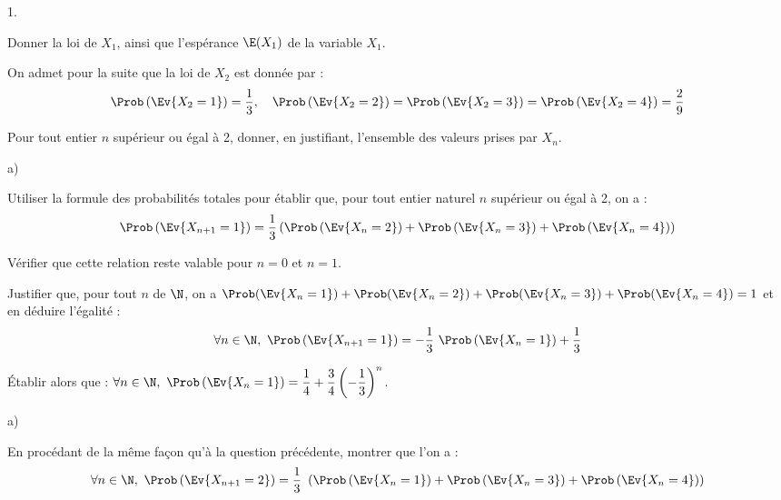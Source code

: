 \begin{noliste}{1.}
  \setlength{\itemsep}{4mm}
\item Donner la loi de $X_{1}$, ainsi que l'espérance $\E(X_{1})$ de
  la variable $X_{1}$.

  
  On admet pour la suite que la loi de $X_{2}$ est donnée par :
  \[
  \Prob\left(\Ev{X_{2} = 1}\right) = \dfrac{1}{3}, \quad
  \Prob\left(\Ev{X_{2} = 2}\right) = \Prob\left(\Ev{X_{2} = 3}\right)
  = \Prob\left(\Ev{X_{2} = 4}\right) = \dfrac{2}{9}
  \]




\item Pour tout entier $n$ supérieur ou égal à 2, donner, en
  justifiant, l'ensemble des valeurs prises par $X_{n}$.

  

\item
  \begin{noliste}{a)}
    \setlength{\itemsep}{2mm}
  \item Utiliser la formule des probabilités totales pour établir que,
    pour tout entier naturel $n$ supérieur ou égal à 2, on a :
    \[
    \Prob\left(\Ev{X_{n + 1} = 1}\right) =
    \dfrac{1}{3}\left(\Prob\left(\Ev{X_{n} = 2}\right) + \Prob\left(\Ev{X_{n}
          = 3}\right) + \Prob\left(\Ev{X_{n} = 4}\right)\right)
    \]

    

  \item Vérifier que cette relation reste valable pour $n = 0$ et $n =
    1$.

    

  \item Justifier que, pour tout $n$ de $\N$, on a $\Prob(\Ev{X_{n} =
      1}) + \Prob(\Ev{X_{n} = 2}) + \Prob(\Ev{X_{n} = 3}) +
    \Prob(\Ev{X_{n} = 4}) = 1$ et en déduire l'égalité :
    \[
    \forall n \in \N, \ \Prob\left(\Ev{X_{n + 1} = 1}\right) =
    -\dfrac{1}{3} \ \Prob\left(\Ev{X_{n} = 1}\right) + \dfrac{1}{3}
    \]

    




  \item Établir alors que : $\forall n \in \N, \ \Prob\left(\Ev{X_{n}
        = 1}\right) = \dfrac{1}{4} +
    \dfrac{3}{4}\left(-\dfrac{1}{3}\right)^{n}$.

    
  \end{noliste}
  



\item
  \begin{noliste}{a)}
    \setlength{\itemsep}{2mm}
  \item En procédant de la même façon qu'à la question précédente,
    montrer que l'on a :
    \[
    \forall n \in \N, \ \Prob\left(\Ev{X_{n + 1} = 2}\right) =
    \dfrac{1}{3} \ \left( \Prob\left(\Ev{X_{n} = 1}\right) +
      \Prob\left(\Ev{X_{n} = 3}\right) + \Prob\left(\Ev{X_{n} =
          4}\right)\right)
    \]


\end{noliste}
\end{noliste}
